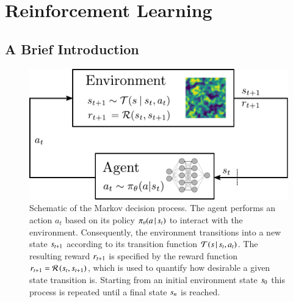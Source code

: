 \section{Reinforcement Learning}
\label{sec:rl}

\subsection{A Brief Introduction}
\label{sec:rl_intro}

\begin{figure}
  \centering
  \includegraphics[width=0.7\linewidth]{RL_MDP.pdf}
  \caption{Schematic of the Markov decision process. The agent performs an action $a_t$ based on its policy $\pi_{\theta}(a \,|\, s_t )$ to interact with the environment. Consequently, the environment transitions into a new state $s_{t+1}$ according to its transition function $\mathcal{T}(s \,|\, s_t ,a_t )$. The resulting reward $r_{t+1}$ is specified by the reward function \mbox{$r_{t+1}=\mathcal{R}\left(s_t,s_{t+1}\right)$}, which is used to quantify how desirable a given state transition is. Starting from an initial environment state $s_0$ this process is repeated until a final state $s_n$ is reached. }
  \label{fig:MDP}
\end{figure}


